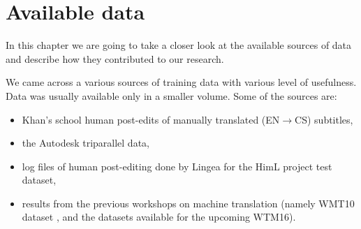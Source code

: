 \chapter{Available data}
\label{chap:data}




In this chapter we are going to take a closer look at the available
sources of data and describe how they contributed to our research.

We came across a various sources of training data with various level
of usefulness. Data was usually available only in a smaller volume. Some of the sources
are:
\begin{itemize}
\item Khan's school human
post-edits of manually translated (EN$\rightarrow$CS) subtitles,
\item the Autodesk
triparallel data,
\item log files of human post-editing done by Lingea for the
HimL project test dataset,


\item results from the previous workshops on machine translation (namely WMT10 dataset \citep{callisonburch-EtAl:2010:WMT},
and the datasets available for the upcoming WTM16).
\end{itemize}

